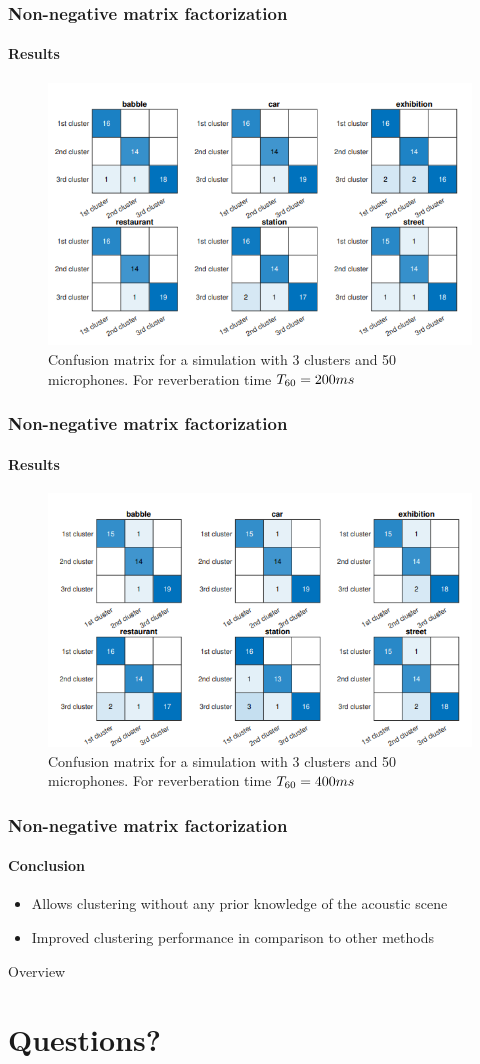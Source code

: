 \documentclass[aspectratio=169]{beamer}
\begin{document}
\begin{frame}
\frametitle{Non-negative matrix factorization}
\framesubtitle{Results}


\begin{figure}
    \centering
    \includegraphics[width=.6\linewidth]{images/200ms.png}
    \caption{Confusion matrix for a simulation with 3 clusters and 50 microphones. For reverberation time $T_{60} = 200 \space ms$}
    \label{fig:my_label}
\end{figure}
    
\end{frame}


\begin{frame}
\frametitle{Non-negative matrix factorization}
\framesubtitle{Results}


\begin{figure}
    \centering
    \includegraphics[width=.6\linewidth]{images/400ms.png}
    \caption{Confusion matrix for a simulation with 3 clusters and 50 microphones. For reverberation time $T_{60} = 400 \space ms$}
    \label{fig:my_label}
\end{figure}

    
\end{frame}



\begin{frame}
\frametitle{Non-negative matrix factorization}
\framesubtitle{Conclusion}

    \begin{itemize}
        \item Allows clustering without any prior knowledge of the acoustic scene
        \item Improved clustering performance in comparison to other methods
    \end{itemize}

\end{frame}

\begin{frame}{Overview}
    \tableofcontents[hideallsubsections]
\end{frame}


\section{Questions?}

\titleframe
\end{document}
